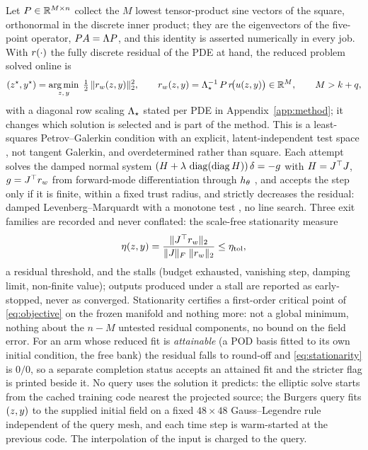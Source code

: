 Let $P\in\mathbb{R}^{M\times n}$ collect the $M$ lowest tensor-product sine
vectors of the square, orthonormal in the discrete inner product; they are the
eigenvectors of the five-point operator, $PA=\Lambda P$, and this
identity is asserted numerically in every job. With $r(\cdot)$ the fully
discrete residual of the PDE at hand, the reduced problem solved online is
\begin{equation}
  (z^{\star},y^{\star})
  =
  \operatorname*{arg\,min}_{z,\,y}\;
  \tfrac12\,\lVert r_{w}(z,y) \rVert_2^2,
  \qquad
  r_{w}(z,y) = \Lambda_\star^{-1}\,P\,r\!\big(u(z,y)\big)
  \in\mathbb{R}^{M},
  \qquad M>k+q ,
  \label{eq:objective}
\end{equation}
with a diagonal row scaling $\Lambda_\star$ stated per PDE in
Appendix~\ref{app:method}; it changes which solution is selected and is part of
the method. This is a least-squares Petrov--Galerkin condition with an
explicit, latent-independent test space \citep{Carlberg2011LSPG,LeeCarlberg2020},
not tangent Galerkin, and overdetermined rather than square.
Each attempt solves the damped normal system
$(H+\lambda\,\operatorname{diag}(\operatorname{diag} H))\,\delta=-g$ with $H=J_{}^{\top}J_{}$, $g=J_{}^{\top}r_{w}$
from forward-mode differentiation through $h_\theta$ \citep{Bradbury2018JAX}, and
accepts the step only if it is finite, within a fixed trust radius, and strictly
decreases the residual: damped Levenberg--Marquardt with a monotone test
\citep{Marquardt1963}, no line search.
Three exit families are recorded and never conflated: the scale-free
stationarity measure
\begin{equation}
  \eta(z,y)
  =
  \frac{\lVert J_{}^{\top}r_{w} \rVert_2}{\lVert J_{} \rVert_{F}\;\lVert r_{w} \rVert_2}
  \le\eta_{\mathrm{tol}},
  \label{eq:stationarity}
\end{equation}
a residual threshold, and the stalls (budget exhausted, vanishing step, damping
limit, non-finite value); outputs produced under a stall are reported as
early-stopped, never as converged. Stationarity certifies a first-order
critical point of \eqref{eq:objective} on the frozen manifold and nothing
more: not a global minimum, nothing about the $n-M$ untested residual
components, no bound on the field error. For an arm whose reduced fit is
\emph{attainable} (a POD basis fitted to its own initial condition, the free
bank) the residual falls to round-off and \eqref{eq:stationarity} is $0/0$, so
a separate completion status accepts an attained fit and the stricter flag is
printed beside it. No query uses the solution it predicts: the elliptic solve
starts from the cached training code nearest the projected source; the Burgers
query fits $(z,y)$ to the supplied initial field on a fixed
$48\times48$ Gauss--Legendre rule independent of the query mesh, and each time
step is warm-started at the previous code. The interpolation of the input is
charged to the query.

